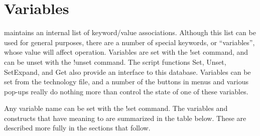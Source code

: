 
\chapter{{\Xic} Variables}
\label{variables}

{\Xic} maintains an internal list of keyword/value associations. 
Although this list can be used for general purposes, there are a
number of special keywords, or ``variables'', whose value will affect
{\Xic} operation.  Variables are set with the {\cb !set} command, and
can be unset with the {\cb !unset} command.  The script functions {\vt
Set}, {\vt Unset}, {\vt SetExpand}, and {\vt Get} also provide
an interface to this database.  Variables can be set from the
technology file, and a number of the buttons in menus and various
pop-ups really do nothing more than control the state of one of these
variables.

Any variable name can be set with the {\cb !set} command.  The
variables and constructs that have meaning to {\Xic} are summarized in
the table below.  These are described more fully in the sections that
follow.

